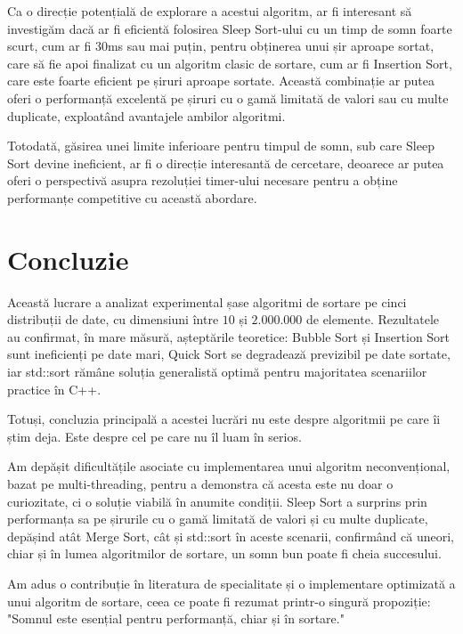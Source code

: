 \documentclass[9pt,a4paper,twocolumn,twoside]{rho-class/rho}
\begin{document}
        \begin{rhoenv}[frametitle=Direcții viitoare de cercetare]
Ca o direcție potențială de explorare a acestui algoritm, ar fi interesant să investigăm dacă ar fi eficientă folosirea Sleep Sort-ului cu un timp de somn foarte scurt, cum ar fi 30ms sau mai puțin, pentru obținerea unui șir aproape sortat, care să fie apoi finalizat cu un algoritm clasic de sortare, cum ar fi Insertion Sort, care este foarte eficient pe șiruri aproape sortate. 
Această combinație ar putea oferi o performanță excelentă pe șiruri cu o gamă limitată de valori sau cu multe duplicate, exploatând avantajele ambilor algoritmi.
\par Totodată, găsirea unei limite inferioare pentru timpul de somn, sub care Sleep Sort devine ineficient, ar fi o direcție interesantă de cercetare, deoarece ar putea oferi o perspectivă asupra rezoluției timer-ului necesare pentru a obține performanțe competitive cu această abordare.
        \end{rhoenv}


\section{Concluzie}
\label{sec:concluzii}

Această lucrare a analizat experimental șase algoritmi de sortare 
pe cinci distribuții de date, cu dimensiuni între $10$ și $2.000.000$ 
de elemente. Rezultatele au confirmat, în mare măsură, așteptările 
teoretice: Bubble Sort și Insertion Sort sunt ineficienți pe date 
mari, Quick Sort se degradează previzibil pe date sortate, iar 
std::sort rămâne soluția generalistă optimă pentru majoritatea 
scenariilor practice în C++.

\par Totuși, concluzia principală a acestei lucrări nu este despre 
algoritmii pe care îi știm deja. Este despre cel pe care nu îl luam 
în serios.

Am depășit dificultățile asociate cu implementarea unui algoritm neconvențional, bazat pe multi-threading, pentru a demonstra că acesta este nu doar o curiozitate, ci o soluție viabilă în anumite condiții.
Sleep Sort a surprins prin performanța sa pe șirurile cu o gamă limitată de valori și cu multe duplicate,
depășind atât Merge Sort, cât și std::sort în aceste scenarii, confirmând că uneori, chiar și în lumea algoritmilor de sortare, un somn bun poate fi cheia succesului.

\par Am adus o contribuție în literatura de specialitate și o implementare optimizată a unui algoritm de sortare, ceea ce poate fi rezumat printr-o singură propoziție: "Somnul este esențial pentru performanță, chiar și în sortare."
\end{document}
